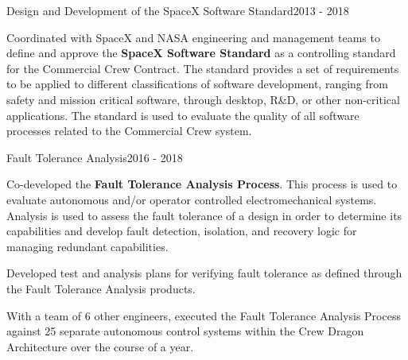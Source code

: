\begin{cventries}
  \cventry
  {Design and Development of the SpaceX Software Standard}{}{}{2013 - 2018}
  {
    \begin{cvitems}
    \item Coordinated with SpaceX and NASA engineering and management teams to define and approve
      the \textbf{SpaceX Software Standard} as a controlling standard for the Commercial Crew
      Contract. The standard provides a set of requirements to be applied to different
      classifications of software development, ranging from safety and mission critical software,
      through desktop, R\&D, or other non-critical applications. The standard is used to evaluate
      the quality of all software processes related to the Commercial Crew system.
    \end{cvitems}
  }


  \cventry
  {Fault Tolerance Analysis}{}{}{2016 - 2018}
  {
    \begin{cvitems}
    \item Co-developed the \textbf{Fault Tolerance Analysis Process}. This process is used to
      evaluate autonomous and/or operator controlled electromechanical systems. Analysis is used to
      assess the fault tolerance of a design in order to determine its capabilities and develop
      fault detection, isolation, and recovery logic for managing redundant capabilities.
    \item Developed test and analysis plans for verifying fault tolerance as defined through the
      Fault Tolerance Analysis products.
    \item With a team of 6 other engineers, executed the Fault Tolerance Analysis Process against 25
      separate autonomous control systems within the Crew Dragon Architecture over the course of a
      year.
    \end{cvitems}
  }
\end{cventries}

